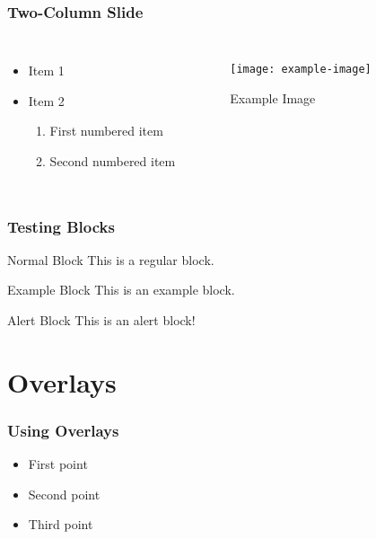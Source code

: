 \documentclass[12pt, aspectratio=169]{beamer}
\begin{document}
\begin{frame}
    \frametitle{Two-Column Slide}
    \begin{columns}
        \begin{itemize}
            \item Item 1
            \item Item 2
            \begin{enumerate}
                \item First numbered item
                \item Second numbered item
            \end{enumerate}
        \end{itemize}
        
        \begin{figure}
            \centering
            \texttt{[image: example-image]} %
            \caption{Example Image}
        \end{figure}
    \end{columns}
\end{frame}

\begin{frame}
    \frametitle{Testing Blocks}
    \begin{block}{Normal Block}
        This is a regular block.
    \end{block}
    \begin{exampleblock}{Example Block}
        This is an example block.
    \end{exampleblock}
    \begin{alertblock}{Alert Block}
        This is an alert block!
    \end{alertblock}
\end{frame}

\section{Overlays}

\begin{frame}
    \frametitle{Using Overlays}
    \begin{itemize}
        \item First point \pause
        \item Second point \pause
        \item Third point
    \end{itemize}
\end{frame}
\end{document}
